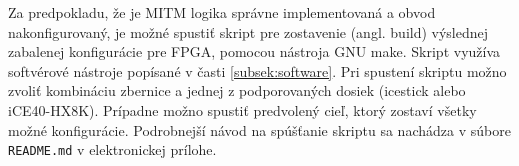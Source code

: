 Za predpokladu, že je MITM logika správne implementovaná a obvod nakonfigurovaný, je možné spustiť skript pre zostavenie (angl. build) výslednej zabalenej konfigurácie pre FPGA, pomocou nástroja GNU make. Skript využíva softvérové nástroje popísané v časti \ref{subsek:software}. Pri spustení skriptu možno zvoliť kombináciu zbernice a jednej z podporovaných dosiek (icestick alebo iCE40-HX8K). Prípadne možno spustiť predvolený cieľ, ktorý zostaví všetky možné konfigurácie. Podrobnejší návod na spúšťanie skriptu sa nachádza v súbore \texttt{README.md} v elektronickej prílohe.
